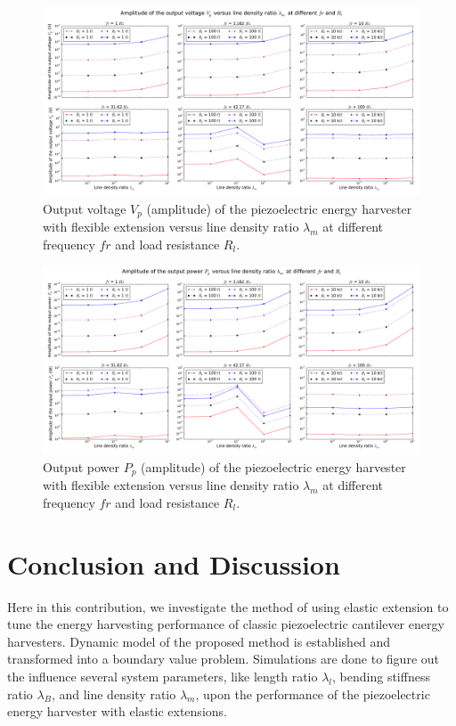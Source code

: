\documentclass{elsarticle}
\begin{document}
\begin{figure}[!htbp]
    \centering
    \includegraphics[width=\textwidth]{./fig_vol_fr_sl_Rl_sl_vs_lamm}
    \caption{Output voltage $V_p$ (amplitude) of the piezoelectric energy harvester with flexible extension versus line density ratio $\lambda_m$ at different frequency $fr$ and load resistance $R_l$. \color{red}{legend to be revised} }
    \label{fig:fig_vol_fr_sl_Rl_sl_vs_lamm}
\end{figure}


\begin{figure}[!htbp]
    \centering
    \includegraphics[width=\textwidth]{./fig_pow_fr_sl_Rl_sl_vs_lamm}
    \caption{Output power $P_p$ (amplitude) of the piezoelectric energy harvester with flexible extension versus line density ratio $\lambda_m$ at different frequency $fr$ and load resistance $R_l$. \color{red}{legend to be revised} }
    \label{fig:fig_pow_fr_sl_Rl_sl_vs_lamm}
\end{figure}


\section{Conclusion and Discussion}

Here in this contribution, we investigate the method of using elastic extension to tune the energy harvesting performance of classic piezoelectric cantilever energy harvesters. Dynamic model of the proposed method is established and transformed into a boundary value problem. Simulations are done to figure out the influence several system parameters, like length ratio $\lambda_l$, bending stiffness ratio $\lambda_B$, and line density ratio $\lambda_m$, upon the performance of the piezoelectric energy harvester with elastic extensions. 
\end{document}
